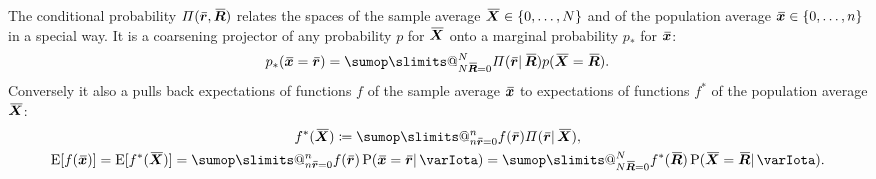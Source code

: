 \documentclass{article}
\makeatletter
\theoremstyle{remark}
\theoremstyle{innote}
\def\sum{\DOTSI\sumop\slimits@}
\newcommand*{\defd}{\coloneqq}
\renewcommand*{\|}{\mathpunct{|}}%
\newcommand*{\dotv}{\mathord{\,\cdot\,}}%
\DeclarePairedDelimiter\clcl{[}{]}
\DeclarePairedDelimiter\set{\{}{\}}
\newcommand*{\p}{\mathrm{P}}%
\newcommand*{\E}{\mathrm{E}}
\newcommand*{\expeb}{\E\clcl}%
\theoremstyle{simple}
\newcommand*{\widebar}[1]{{\mkern1.5mu\skew{2}\overline{\mkern-1.5mu#1\mkern-1.5mu}\mkern 1.5mu}}
\newcommand*{\av}{\widebar} %
\newcommand*{\sav}{\widebar} %
\newcommand*{\ypp}{\varPi}
\newcommand*{\yxx}{x}%
\newcommand*{\yx}{\bm{\yxx}}%
\newcommand*{\yxs}{\sav{\yx}}%
\newcommand*{\yX}{\bm{X}}%
\newcommand*{\yXf}{\av{\yX}}%
\newcommand*{\yr}{\bm{r}}%
\newcommand*{\yrs}{\sav{\yr}}%
\newcommand*{\yR}{\bm{R}}%
\newcommand*{\yRf}{\av{\yR}}%
\newcommand*{\yH}{\varIota}
\makeatother
\begin{document}
The conditional probability $\ypp(\yrs,\yRf)$ relates the spaces of the
sample average $\yXf\in\set{0,\dotsc,N}$ and of the population average
$\yxs\in\set{0,\dotsc,n}$ in a special way. It is a coarsening projector of
any probability $p$ for $\yXf$ onto a marginal probability $p_*$ for
$\yxs$:
\begin{equation}
  \label{eq:projection_P}
  p_*(\yxs=\yrs)
  = \sum_{N\yRf=0}^N \ypp(\yrs\|\yRf) p(\yXf=\yRf).
\end{equation}
Conversely it also a pulls back expectations of functions $f$ of the sample
average $\yxs$ to expectations of functions $f^*$ of the population average
$\yXf$:
\begin{equation}
  \label{eq:pullback_P}
  \begin{gathered}
    f^*(\yXf) \defd \sum_{n\yrs=0}^n f(\yrs)\ypp(\yrs\|\yXf),
    \\
   \expeb{f(\yxs)}= \expeb{f^*(\yXf)}
    =
    \sum_{n\yrs=0}^n f(\yrs)\,\p(\yxs=\yrs \| \yH)
    =
    \sum_{N\yRf=0}^N f^*(\yRf)\,\p(\yXf=\yRf \| \yH).
  \end{gathered}
\end{equation}
\end{document}

